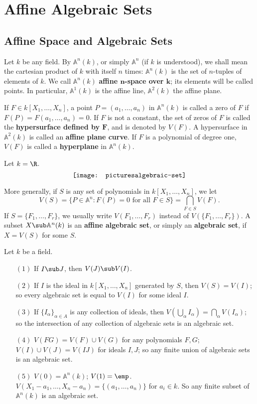 \section{Affine Algebraic Sets}
\subsection{Affine Space and Algebraic Sets}
Let $k$ be any field. By $\mathbb{A}^n(k)$, or simply $\mathbb{A}^n$ (if $k$ is understood), we shall mean the cartesian product of $k$ with itself $n$ times: $\mathbb{A}^n(k)$ is the set of $n$-tuples of elements of $k$. We call $\mathbb{A}^n(k)$ \textbf{affine $\bm{n}$-space over $\bm{k}$}; its elements will be called points. In particular, $\mathbb{A}^1(k)$ is the affine line, $\mathbb{A}^2(k)$ the affine plane.\par 
If $F\in k[X_1,\dots,X_n]$, a point $P=(a_1,\dots,a_n)$ in $\mathbb{A}^n(k)$ is called a zero of $F$ if $F(P)=F(a_1,\dots,a_n)=0$. If $F$ is not a constant, the set of zeros of $F$ is called the \textbf{hypersurface defined by $\bm{F}$}, and is denoted by $V(F)$. A hypersurface in $\mathbb{A}^2(k)$ is called an \textbf{affine plane curve}. If $F$ is a polynomial of degree one, $V(F)$ is called a \textbf{hyperplane} in $\mathbb{A}^n(k)$.
\begin{example}
Let $k=\R$.
\[\texttt{[image: pictures\\algebraic-set]}\]
\end{example}
More generally, if $S$ is any set of polynomials in $k[X_1,\dots,X_n]$, we let 
\[V(S)=\{P\in\mathbb{A}^n:F(P)=0\text{ for all }F\in S\}=\bigcap_{F\in S}V(F).\]
If $S=\{F_1,\dots,F_r\}$, we usually write $V(F_1,\dots,F_r)$ instead of $V(\{F_1,\dots,F_r\})$. A subset $X\sub\mathbb{A}^n(k)$ is an \textbf{affine algebraic set}, or simply an \textbf{algebraic set}, if $X=V(S)$ for some $S$.
\begin{proposition}
Let $k$ be a field.
\begin{itemize}
\item[$(1)$] If $I\sub J$, then $V(J)\sub V(I)$.
\item[$(2)$] If $I$ is the ideal in $k[X_1,\dots,X_n]$ generated by $S$, then $V(S)=V(I)$; so every algebraic set is equal to $V(I)$ for some ideal $I$.
\item[$(3)$] If $\{I_\alpha\}_{\alpha\in A}$ is any collection of ideals, then $V(\bigcup_\alpha I_\alpha)=\bigcap_\alpha V(I_\alpha)$; so the intersection of any collection of algebraic sets is an algebraic set. 
\item[$(4)$] $V(FG)=V(F)\cup V(G)$ for any polynomials $F,G$; $V(I)\cup V(J)=V(IJ)$ for ideals $I,J$; so any finite union of algebraic sets is an algebraic set.
\item[$(5)$] $V(0)=\mathbb{A}^n(k)$; $V(1)=\emp$. $V(X_1-a_1,\dots,X_n-a_n)=\{(a_1,\dots,a_n)\}$ for $a_i\in k$. So any finite subset of $\mathbb{A}^n(k)$ is an algebraic set.
\end{itemize}
\end{proposition}
